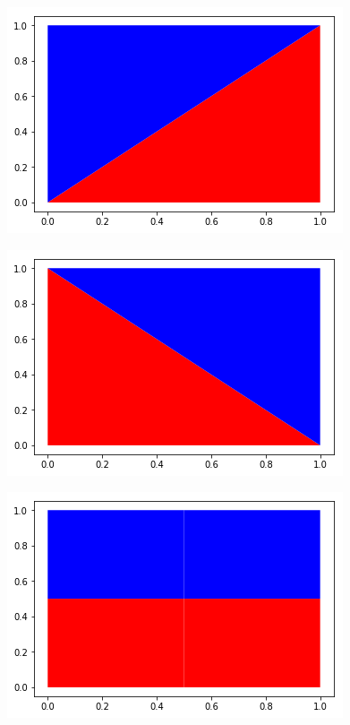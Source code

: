 \documentclass[12pt, a4paper]{article}
\begin{document}
\begin{figure}[H]
\begin{minipage}[b]{.5\linewidth}
		\includegraphics[width = \textwidth]{seccion_diagonal_ascendente}
		\label{fig:diagonal_a}
	\end{minipage}
	\begin{minipage}[b]{.5\linewidth}
		\includegraphics[width = \textwidth]{seccion_diagonal_descendente}
		\label{fig:diagonal_d}

		\includegraphics[width = \textwidth]{seccion_cruz}
		\label{fig:cruz}


\end{minipage}
\end{figure}
\end{document}
